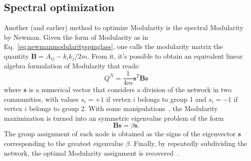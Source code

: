 \subsection{Spectral optimization}
Another (and earlier) method to optimize Modularity is the spectral Modularity by Newman. Given the form of Modularity as in Eq.~\ref{eq:newmanmodularityspinglass}, one calls the modularity matrix the quantity $\mathbf{B}=A_{ij} - k_i k_j/2m$. From it, it's possible to obtain an equivalent linear algebra formulation of Modularity that reads:
\begin{equation}\label{eq:newman_spectral}
Q^N = \frac{1}{4m} \mathbf{s}^T \mathbf{B} \mathbf{s}
\end{equation}
where $\mathbf{s}$ is a numerical vector that considers a division of the network in two communities, with values $s_i=+1$ if vertex $i$ belongs to group 1 and $s_i=-1$ if vertex $i$ belongs to group 2. With some manipulations~\cite{newman2006,newman2010book}, the Modularity maximization is turned into an symmetric eigenvalue problem of the form
\begin{equation}
\mathbf{B} \mathbf{s} = \beta \mathbf{s}.
\end{equation}
The group assignment of each node is obtained as the signs of the eigenvector $\mathbf{s}$ corresponding to the greatest eigenvalue $\beta$. Finally, by repeatedly subdividing the network, the optimal Modularity assignment is recovered~\cite{newman2006,newman2010book}.

